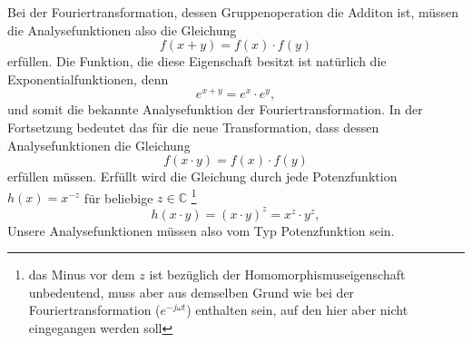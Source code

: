 Bei der Fouriertransformation, dessen Gruppenoperation die Additon ist, 
müssen die Analysefunktionen also die Gleichung 
\begin{equation}
    f(x + y) = f(x) \cdot f(y)
    \label{mellin:hom1}
\end{equation}
erfüllen. 
Die Funktion, die diese Eigenschaft besitzt ist natürlich die 
Exponentialfunktionen, denn 
\begin{equation}
    e^{x + y} = e^x \cdot e^y,
    \label{mellin:exp}
\end{equation}
und somit die bekannte Analysefunktion der Fouriertransformation.
In der Fortsetzung bedeutet das für die neue Transformation, dass dessen 
Analysefunktionen die Gleichung
\begin{equation}
    f(x \cdot y) = f(x) \cdot f(y)
    \label{mellin:hom2}
\end{equation}
erfüllen müssen.
Erfüllt wird die Gleichung durch jede Potenzfunktion $h(x) = x^{-z}$ für 
beliebige $z \in \mathbb{C}$ \footnote{das Minus vor dem $z$ ist bezüglich 
der Homomorphismuseigenschaft unbedeutend, muss aber aus demselben Grund 
wie bei der Fouriertransformation ($e^{-j\omega t}$) enthalten sein, auf 
den hier aber nicht eingegangen werden soll}
\begin{equation}
    h(x \cdot y) =  (x \cdot y)^{z} = x^{z} \cdot y^{z},
\end{equation}
Unsere Analysefunktionen müssen also vom Typ Potenzfunktion sein.


